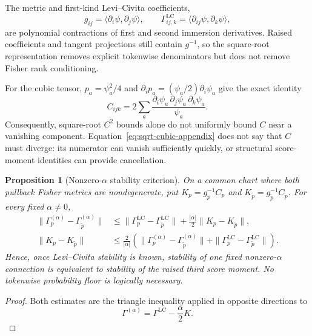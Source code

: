 \documentclass[11pt]{article}
\newtheorem{proposition}[theorem]{Proposition}
\theoremstyle{definition}
\theoremstyle{remark}
\newcommand{\LC}{\mathrm{LC}}
\begin{document}
The metric and first-kind Levi--Civita coefficients,
\begin{equation}
    g_{ij}=\langle\partial_i\psi,\partial_j\psi\rangle,
    \qquad
    \Gamma^{\LC}_{ij,k}
    =\langle\partial_{ij}\psi,\partial_k\psi\rangle,
\end{equation}
are polynomial contractions of first and second immersion derivatives. Raised coefficients and tangent projections still contain $g^{-1}$, so the square-root representation removes explicit tokenwise denominators but does not remove Fisher rank conditioning.

For the cubic tensor, $p_a=\psi_a^2/4$ and $\partial_i p_a=(\psi_a/2)\partial_i\psi_a$ give the exact identity
\begin{equation}
    C_{ijk}
    =2\sum_a
      \frac{\partial_i\psi_a\,\partial_j\psi_a\,
            \partial_k\psi_a}{\psi_a}.
    \label{eq:sqrt-cubic-appendix}
\end{equation}
Consequently, square-root $C^2$ bounds alone do not uniformly bound $C$ near a vanishing component. Equation~\eqref{eq:sqrt-cubic-appendix} does not say that $C$ must diverge: its numerator can vanish sufficiently quickly, or structural score-moment identities can provide cancellation.

\begin{proposition}[Nonzero-$\alpha$ stability criterion]\label{prop:alpha-equivalence}
On a common chart where both pullback Fisher metrics are nondegenerate, put
$K_p=g_p^{-1}C_p$ and
$K_{\widetilde p}=g_{\widetilde p}^{-1}C_{\widetilde p}$. For every fixed
$\alpha\ne0$,
\begin{align}
    \|\Gamma_p^{(\alpha)}-\Gamma_{\widetilde p}^{(\alpha)}\|
    &\le
    \|\Gamma_p^{\LC}-\Gamma_{\widetilde p}^{\LC}\|
    +\frac{|\alpha|}{2}\|K_p-K_{\widetilde p}\|,
    \label{eq:alpha-equivalence-forward}\\
    \|K_p-K_{\widetilde p}\|
    &\le\frac{2}{|\alpha|}
    \left(
      \|\Gamma_p^{(\alpha)}-\Gamma_{\widetilde p}^{(\alpha)}\|
      +\|\Gamma_p^{\LC}-\Gamma_{\widetilde p}^{\LC}\|
    \right).
    \label{eq:alpha-equivalence-reverse}
\end{align}
Hence, once Levi--Civita stability is known, stability of one fixed nonzero-$\alpha$ connection is equivalent to stability of the raised third score moment. No tokenwise probability floor is logically necessary.
\end{proposition}

\begin{proof}
Both estimates are the triangle inequality applied in opposite directions to
\begin{equation}
    \Gamma^{(\alpha)}=\Gamma^{\LC}-\frac{\alpha}{2}K.
\end{equation}
\end{proof}
\end{document}
